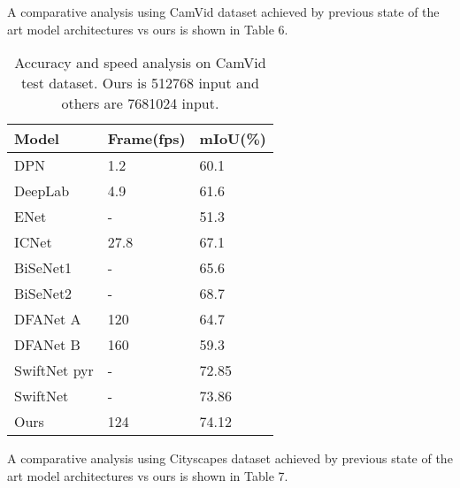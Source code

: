 \documentclass{article}
\begin{document}
A comparative analysis using CamVid dataset achieved by previous state of the art model architectures vs ours is shown in Table 6.

\begin{table}[h]
  \caption{Accuracy and speed analysis on CamVid test dataset. Ours is 512768 input and others are 7681024 input.}
  \label{sample-table6}
  \centering
  \begin{tabular}{lll}
  \toprule
    Model &Frame(fps) &mIoU(\%)\\
   \midrule
DPN \citep{yu2018learning} &1.2 &60.1\\
DeepLab \citep{chen2017deeplab} &4.9 &61.6\\
ENet \citep{paszke2016enet} &- &51.3\\
ICNet \citep{zhao2018icnet} &27.8 &67.1\\
BiSeNet1 \citep{yu2018bisenet} &- &65.6\\
BiSeNet2 \citep{yu2018bisenet} &- &68.7\\
DFANet A \citep{li2019dfanet} &120 &64.7\\
DFANet B \citep{li2019dfanet} &160 &59.3\\
SwiftNet pyr \citep{orsic2019defense} &- &72.85\\
SwiftNet \citep{orsic2019defense} &- &73.86\\
Ours &124 &74.12\\
    \bottomrule
  \end{tabular}
\end{table}

A comparative analysis using Cityscapes dataset achieved by previous state of the art model architectures vs ours is shown in Table 7.
\end{document}
